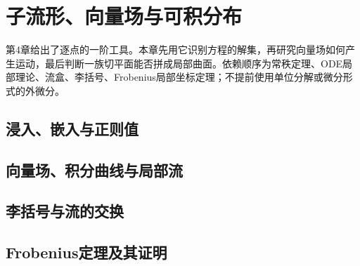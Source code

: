 \chapter{子流形、向量场与可积分布}
\label{ch:05-submanifolds}

第4章给出了逐点的一阶工具。本章先用它识别方程的解集，再研究向量场如何产生运动，最后判断一族切平面能否拼成局部曲面。依赖顺序为常秩定理、ODE局部理论、流盒、李括号、Frobenius局部坐标定理；不提前使用单位分解或微分形式的外微分。

\section{浸入、嵌入与正则值}


\section{向量场、积分曲线与局部流}


\section{李括号与流的交换}


\section{Frobenius定理及其证明}



